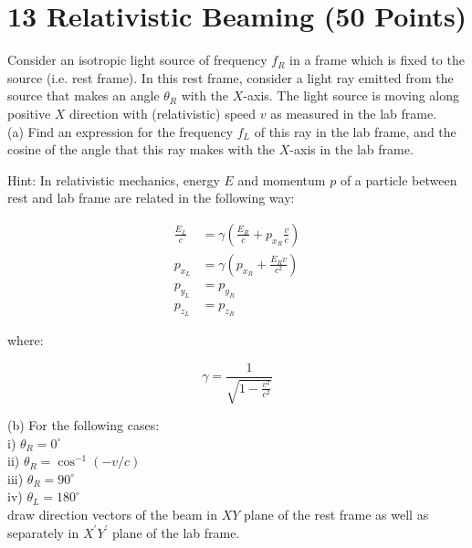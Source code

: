 \documentclass[10pt]{article}
\begin{document}
\section*{13 Relativistic Beaming (50 Points)}
Consider an isotropic light source of frequency $f_{R}$ in a frame which is fixed to the source (i.e. rest frame). In this rest frame, consider a light ray emitted from the source that makes an angle $\theta_{R}$ with the $X$-axis. The light source is moving along positive $X$ direction with (relativistic) speed $v$ as measured in the lab frame.\\
(a) Find an expression for the frequency $f_{L}$ of this ray in the lab frame, and the cosine of the angle that this ray makes with the $X$-axis in the lab frame.

Hint: In relativistic mechanics, energy $E$ and momentum $p$ of a particle between rest and lab frame are related in the following way:

$$
\begin{aligned}
\frac{E_{L}}{c} & =\gamma\left(\frac{E_{R}}{c}+p_{x_{R}} \frac{v}{c}\right) \\
p_{x_{L}} & =\gamma\left(p_{x_{R}}+\frac{E_{R} v}{c^{2}}\right) \\
p_{y_{L}} & =p_{y_{R}} \\
p_{z_{L}} & =p_{z_{R}}
\end{aligned}
$$

where:

$$
\gamma=\frac{1}{\sqrt{1-\frac{v^{2}}{c^{2}}}}
$$

(b) For the following cases:\\
i) $\theta_{R}=0^{\circ}$\\
ii) $\theta_{R}=\cos ^{-1}(-v / c)$\\
iii) $\theta_{R}=90^{\circ}$\\
iv) $\theta_{L}=180^{\circ}$\\
draw direction vectors of the beam in $X Y$ plane of the rest frame as well as separately in $X^{\prime} Y^{\prime}$ plane of the lab frame.
\end{document}
